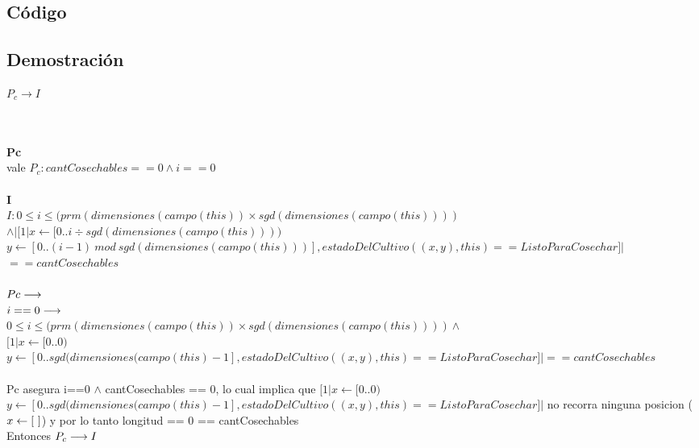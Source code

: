 \documentclass[a4paper]{article}
\begin{document}
    \subsection{C\'odigo}
    

    \subsection{Demostraci\'on}
        \noindent
        \begin{large}
       {$P_c \rightarrow I$}
        \end{large} \\
        \\
        \textbf{Pc} \\
        vale $ P_c : cantCosechables == 0 \land i == 0$ \\
        \\
		\textbf{I} \\
        $ I: 0 \leq i \leq (prm(dimensiones(campo(this)) \times sgd(dimensiones(campo(this)))) $\\ $ \land | [1| x \leftarrow [0..i \div sgd(dimensiones(campo(this)))) $\\ $ y \leftarrow [0.. (i-1) \ mod \ sgd(dimensiones(campo(this)))], estadoDelCultivo((x,y), this) == ListoParaCosechar]| $\\$ == cantCosechables $\\   
\\ $Pc \longrightarrow$\\
$i == 0 \longrightarrow$\\
$ 0 \leq i \leq (prm(dimensiones(campo(this)) \times sgd(dimensiones(campo(this)))) \land $\\$
[1| x \leftarrow [0..0) $\\ $ y \leftarrow [0.. sgd(dimensiones(campo(this) - 1], estadoDelCultivo((x,y), this) == ListoParaCosechar]| == cantCosechables$\\
\\ Pc asegura i==0 $ \land $ cantCosechables == 0, lo cual implica que $ [1| x \leftarrow [0..0) $\\ $ y \leftarrow [0.. sgd(dimensiones(campo(this) - 1], estadoDelCultivo((x,y), this) == ListoParaCosechar]|$ no recorra ninguna posicion ( $x \leftarrow [\ ]$) y por lo tanto longitud == 0 == cantCosechables\\
Entonces $P_c \longrightarrow I$
\end{document}
